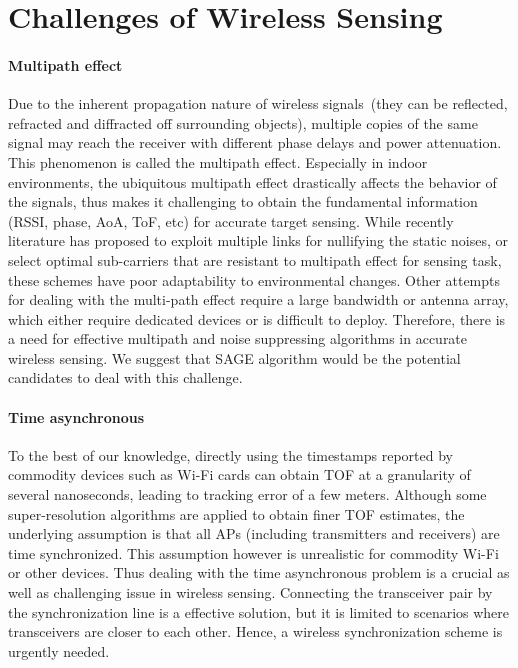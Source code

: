 \section{Challenges of Wireless Sensing}

\paragraph*{Multipath effect}  Due to the inherent propagation nature of wireless signals~(they can be reflected, refracted and diffracted off
surrounding objects), multiple copies of the same signal may reach the receiver with different phase delays and power attenuation. This
phenomenon is called the multipath effect. Especially in indoor environments, the ubiquitous multipath effect drastically affects the
behavior of the signals, thus makes it challenging to obtain the fundamental information (RSSI, phase, AoA, ToF, etc) for accurate target
sensing. While recently literature has proposed to exploit multiple links for nullifying the static noises, or select optimal sub-carriers
that are resistant to multipath effect for sensing task, these schemes have poor adaptability to environmental changes. Other attempts for
dealing with the multi-path effect require a large bandwidth or antenna array, which either require dedicated devices or is difficult to
deploy. Therefore, there is a need for effective multipath and noise suppressing algorithms in accurate wireless sensing. We suggest that
SAGE algorithm would be the potential candidates to deal with this challenge.

\paragraph*{Time asynchronous} To the best of our knowledge, directly using the timestamps reported by commodity devices such as Wi-Fi cards can obtain TOF at a granularity of several nanoseconds, leading to tracking error of a few meters. Although some super-resolution algorithms are applied to obtain finer TOF estimates, the underlying assumption is that all APs (including transmitters and receivers) are time synchronized. This assumption however is unrealistic for commodity Wi-Fi or other devices. Thus dealing with the time asynchronous problem is a crucial as well as challenging issue in wireless sensing. Connecting the transceiver pair by the synchronization line is a effective solution, but it is limited to scenarios where transceivers are closer to each other. Hence, a wireless synchronization scheme is urgently needed.

